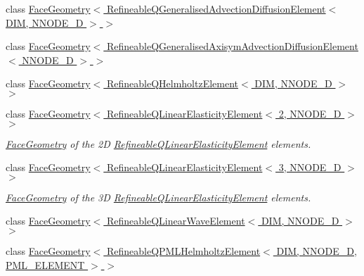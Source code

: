 \begin{DoxyCompactItemize}
class \hyperlink{classoomph_1_1FaceGeometry_3_01RefineableQGeneralisedAdvectionDiffusionElement_3_01DIM_00_01NNODE__1D_01_4_01_4}{Face\+Geometry$<$ Refineable\+Q\+Generalised\+Advection\+Diffusion\+Element$<$ D\+I\+M, N\+N\+O\+D\+E\+\_\+D $>$ $>$}
\item 
class \hyperlink{classoomph_1_1FaceGeometry_3_01RefineableQGeneralisedAxisymAdvectionDiffusionElement_3_01NNODE__1D_01_4_01_4}{Face\+Geometry$<$ Refineable\+Q\+Generalised\+Axisym\+Advection\+Diffusion\+Element$<$ N\+N\+O\+D\+E\+\_\+D $>$ $>$}
\item 
class \hyperlink{classoomph_1_1FaceGeometry_3_01RefineableQHelmholtzElement_3_01DIM_00_01NNODE__1D_01_4_01_4}{Face\+Geometry$<$ Refineable\+Q\+Helmholtz\+Element$<$ D\+I\+M, N\+N\+O\+D\+E\+\_\+D $>$ $>$}
\item 
class \hyperlink{classoomph_1_1FaceGeometry_3_01RefineableQLinearElasticityElement_3_012_00_01NNODE__1D_01_4_01_4}{Face\+Geometry$<$ Refineable\+Q\+Linear\+Elasticity\+Element$<$ 2, N\+N\+O\+D\+E\+\_\+D $>$ $>$}
\begin{DoxyCompactList}\small\item\em \hyperlink{classoomph_1_1FaceGeometry}{Face\+Geometry} of the 2D \hyperlink{classoomph_1_1RefineableQLinearElasticityElement}{Refineable\+Q\+Linear\+Elasticity\+Element} elements. \end{DoxyCompactList}\item 
class \hyperlink{classoomph_1_1FaceGeometry_3_01RefineableQLinearElasticityElement_3_013_00_01NNODE__1D_01_4_01_4}{Face\+Geometry$<$ Refineable\+Q\+Linear\+Elasticity\+Element$<$ 3, N\+N\+O\+D\+E\+\_\+D $>$ $>$}
\begin{DoxyCompactList}\small\item\em \hyperlink{classoomph_1_1FaceGeometry}{Face\+Geometry} of the 3D \hyperlink{classoomph_1_1RefineableQLinearElasticityElement}{Refineable\+Q\+Linear\+Elasticity\+Element} elements. \end{DoxyCompactList}\item 
class \hyperlink{classoomph_1_1FaceGeometry_3_01RefineableQLinearWaveElement_3_01DIM_00_01NNODE__1D_01_4_01_4}{Face\+Geometry$<$ Refineable\+Q\+Linear\+Wave\+Element$<$ D\+I\+M, N\+N\+O\+D\+E\+\_\+D $>$ $>$}
\item 
class \hyperlink{classoomph_1_1FaceGeometry_3_01RefineableQPMLHelmholtzElement_3_01DIM_00_01NNODE__1D_00_01PML__ELEMENT_01_4_01_4}{Face\+Geometry$<$ Refineable\+Q\+P\+M\+L\+Helmholtz\+Element$<$ D\+I\+M, N\+N\+O\+D\+E\+\_\+D, P\+M\+L\+\_\+\+E\+L\+E\+M\+E\+N\+T $>$ $>$}

\end{DoxyCompactItemize}
